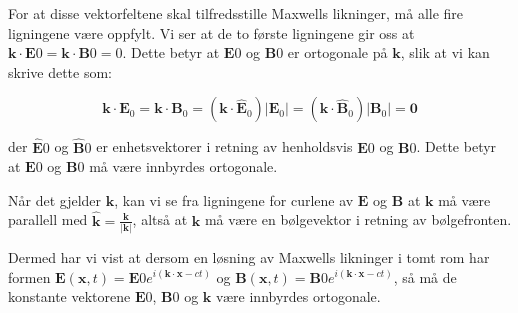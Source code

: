 For at disse vektorfeltene skal tilfredsstille Maxwells likninger, må alle fire ligningene være oppfylt. Vi ser at de to første ligningene gir oss at $\mathbf{k} \cdot \mathbf{E}{0} = \mathbf{k} \cdot \mathbf{B}{0} = 0$. Dette betyr at $\mathbf{E}{0}$ og $\mathbf{B}{0}$ er ortogonale på $\mathbf{k}$, slik at vi kan skrive dette som:

\begin{equation*}
    \mathbf{k} \cdot \mathbf{E}_{0}=\mathbf{k} \cdot \mathbf{B}_{0}=\left(\mathbf{k} \cdot \hat{\mathbf{E}}_{0}\right)\left|\mathbf{E}_{0}\right|=\left(\mathbf{k} \cdot \hat{\mathbf{B}}_{0}\right)\left|\mathbf{B}_{0}\right|=\mathbf{0}
\end{equation*}

der $\hat{\mathbf{E}}{0}$ og $\hat{\mathbf{B}}{0}$ er enhetsvektorer i retning av henholdsvis $\mathbf{E}{0}$ og $\mathbf{B}{0}$. Dette betyr at $\mathbf{E}{0}$ og $\mathbf{B}{0}$ må være innbyrdes ortogonale.

Når det gjelder $\mathbf{k}$, kan vi se fra ligningene for curlene av $\mathbf{E}$ og $\mathbf{B}$ at $\mathbf{k}$ må være parallell med $\hat{\mathbf{k}} = \frac{\mathbf{k}}{|\mathbf{k}|}$, altså at $\mathbf{k}$ må være en bølgevektor i retning av bølgefronten.

Dermed har vi vist at dersom en løsning av Maxwells likninger i tomt rom har formen $\mathbf{E}(\mathbf{x}, t)=\mathbf{E}{0} e^{i(\mathbf{k} \cdot \mathbf{x}-c t)}$ og $\mathbf{B}(\mathbf{x}, t)=\mathbf{B}{0} e^{i(\mathbf{k} \cdot \mathbf{x}-c t)}$, så må de konstante vektorene $\mathbf{E}{0}$, $\mathbf{B}{0}$ og $\mathbf{k}$ være innbyrdes ortogonale.

